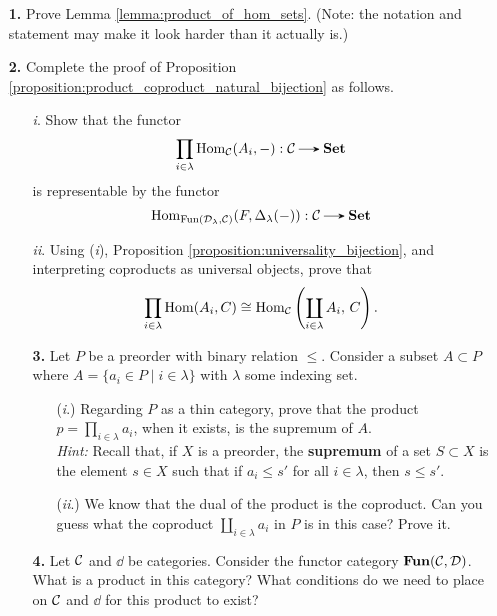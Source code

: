     \begin{itemize}
        \item[\textbf{1.}] Prove Lemma \ref{lemma:product_of_hom_sets}. (Note: the notation and statement may make 
        it look harder than it actually is.)
        
        \item[\textbf{2.}]
        Complete the proof of Proposition \ref{proposition:product_coproduct_natural_bijection} as follows. 
        \begin{itemize}
            \item[\emph{i}.]
            Show that the functor 
            \[
                \prod_{i \in \lambda} \hom_{\cc}(A_i, -): \cc \to \textbf{Set}
            \]
            is representable by the functor 
            \[
                \hom_{\text{Fun}(\dd_{\lambda}, \cc)}(F, \Delta_{\lambda}(-)): \cc \to \textbf{Set}
            \]
            \item[\emph{ii}.]
            Using (\emph{i}), Proposition \ref{proposition:universality_bijection}, and 
            interpreting coproducts as universal objects, prove that 
            \[
                \prod_{i \in \lambda}\operatorname{\mathrm{Hom}}(A_i, C)
                \cong 
                \operatorname{\mathrm{Hom}}_{\mathcal{C}}\left( \coprod_{i\in \lambda}A_i, \, C \right).
            \]
        
        \item[\textbf{3.}]
        Let $P$ be a preorder with binary relation $\le$. 
        Consider a subset $A \subset P$ where $A = \{a_i \in P \mid i \in \lambda\}$ 
        with $\lambda$ some indexing set.
        \begin{itemize}
            \item[(\emph{i}.)]
            Regarding $P$ as a thin category, prove that the product $p = \displaystyle \prod_{i \in \lambda}a_i$, when it exists, 
            is the supremum of $A$. 
            \\
            \emph{Hint:} Recall that, if $X$ is a preorder, 
            the \textbf{supremum} of a set $S \subset X$ is the element $s \in X$ 
            such that if $a_i \le s'$ for all $i \in \lambda$, then 
            $s \le s'$.
            \item[(\emph{ii}.)] 
            We know that the dual of the product is the coproduct. 
            Can you guess what the coproduct $\displaystyle \coprod_{i \in \lambda}a_i$ in $P$ is 
            in this case? Prove it. 
        \end{itemize}
    
        \item[\textbf{4.}] Let $\mathcal{C}$ and $\dd$ be categories. 
        Consider the functor category $\textbf{Fun}(\mathcal{C}, \mathcal{D})$. What is a product in 
        this category? What conditions do we need to place on $\mathcal{C}$ and $\dd$ for this 
        product to exist?
        \end{itemize}        
    \end{itemize}

